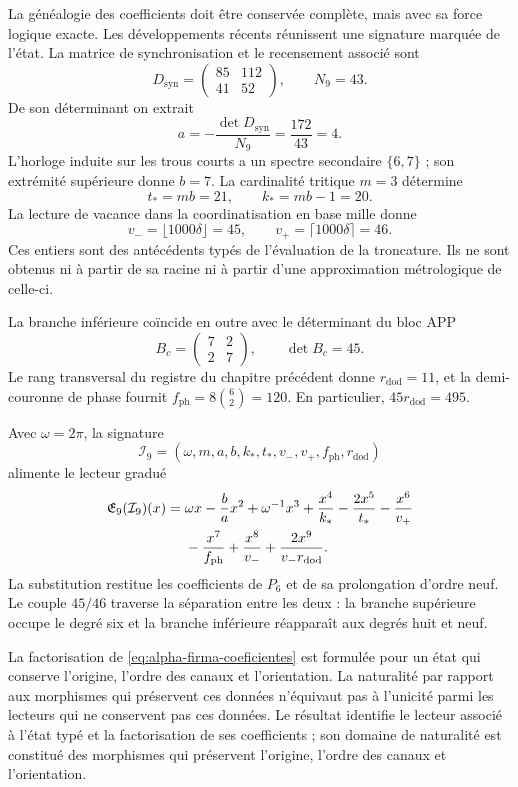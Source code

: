 La généalogie des coefficients doit être conservée complète, mais avec sa
force logique exacte. Les développements récents réunissent une signature marquée
de l'état. La matrice de synchronisation et le recensement associé sont
\[
 D_{\mathrm{syn}}=\begin{pmatrix}85&112\\41&52\end{pmatrix},
 \qquad N_9=43.
\]
De son déterminant on extrait
\[
 a=-\frac{\det D_{\mathrm{syn}}}{N_9}
   =\frac{172}{43}=4.
\]
L'horloge induite sur les trous courts a un spectre secondaire \(\{6,7\}\) ; son extrémité supérieure donne \(b=7\). La cardinalité tritique \(m=3\) détermine
\[
 t_*=mb=21,\qquad k_*=mb-1=20.
\]
La lecture de vacance dans la coordinatisation en base mille donne
\[
 v_-=\lfloor1000\delta\rfloor=45,\qquad
 v_+=\lceil1000\delta\rceil=46.
\]
Ces entiers sont des antécédents typés de l'évaluation de la troncature. Ils ne sont obtenus ni à partir de sa racine ni à partir d'une approximation métrologique de celle-ci.

La branche inférieure coïncide en outre avec le déterminant du bloc APP
\[
 B_c=\begin{pmatrix}7&2\\2&7\end{pmatrix},\qquad\det B_c=45.
\]
Le rang transversal du registre du chapitre précédent donne
\(r_{\mathrm{dod}}=11\), et la demi-couronne de phase fournit
\(f_{\mathrm{ph}}=8\binom62=120\). En particulier,
\(45r_{\mathrm{dod}}=495\).

Avec \(\omega=2\pi\), la signature
\[
 \mathcal I_9=(\omega,m,a,b,k_*,t_*,v_-,v_+,f_{\mathrm{ph}},r_{\mathrm{dod}})
\]
alimente le lecteur gradué
\begin{align}
 \mathfrak E_9(\mathcal I_9)(x)
 ={}&\omega x-\frac ba x^2+\omega^{-1}x^3
 +\frac{x^4}{k_*}-\frac{2x^5}{t_*}-\frac{x^6}{v_+}\notag\\
 &-\frac{x^7}{f_{\mathrm{ph}}}+\frac{x^8}{v_-}
 +\frac{2x^9}{v_-r_{\mathrm{dod}}}.
 \label{eq:alpha-firma-coeficientes}
\end{align}
La substitution restitue les coefficients de \(P_6\) et de sa
prolongation d'ordre neuf. Le couple \(45/46\) traverse la séparation
entre les deux : la branche supérieure occupe le degré six et la branche inférieure réapparaît
aux degrés huit et neuf.

La factorisation de \eqref{eq:alpha-firma-coeficientes} est formulée
pour un état qui conserve l’origine, l’ordre des canaux et l’orientation. La
naturalité par rapport aux morphismes qui préservent ces données n’équivaut pas à
l’unicité parmi les lecteurs qui ne conservent pas ces données. Le résultat
identifie le lecteur associé à l’état typé et la factorisation de ses
coefficients ; son domaine de naturalité est constitué des morphismes
qui préservent l’origine, l’ordre des canaux et l’orientation.

